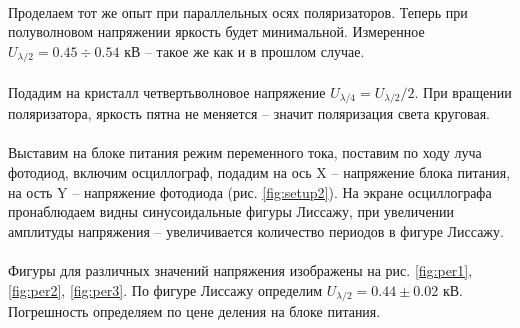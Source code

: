 \documentclass[a4paper,12pt]{article} %
\begin{document}
\paragraph{} Проделаем тот же опыт при параллельных осях поляризаторов. Теперь при полуволновом напряжении яркость будет минимальной. Измеренное $U_{\lambda / 2} = 0.45 \div 0.54$ кВ -- такое же как и в прошлом случае.

\paragraph{} Подадим на кристалл четвертьволновое напряжение $U_{\lambda / 4} = U_{\lambda / 2} / 2$. При вращении поляризатора, яркость пятна не меняется -- значит поляризация света круговая.

\paragraph{} Выставим на блоке питания режим переменного тока, поставим по ходу луча фотодиод, включим осциллограф, подадим на ось X -- напряжение блока питания, на ость Y -- напряжение фотодиода (рис. \ref{fig:setup2}). На экране осциллографа пронаблюдаем видны синусоидальные фигуры Лиссажу, при увеличении амплитуды напряжения -- увеличивается количество периодов в фигуре Лиссажу. 

\paragraph{} Фигуры для различных значений напряжения изображены на рис. \ref{fig:per1}, \ref{fig:per2}, \ref{fig:per3}. По фигуре Лиссажу определим $U_{\lambda/2} = 0.44 \pm 0.02$ кВ. Погрешность определяем по цене деления на блоке питания. 
\end{document}
